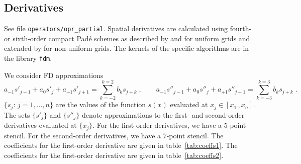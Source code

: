 \subsection{Derivatives}\label{sec:fdm}

See file {\tt operators/opr\_partial}. Spatial derivatives are calculated using fourth- or sixth-order compact Pad\'{e} schemes as described by \cite{Lele:1992} and \cite{Lamballais:2011} for uniform grids and extended by \cite{Shukla:2005} for non-uniform grids. The kernels of the specific algorithms are in the library {\tt fdm}.

We consider FD approximations
\begin{equation}
  a_{-1}s'_{j-1}+a_{0}s'_{j}+a_{+1}s'_{j+1}=\sum_{k=-2}^{k=2}b_ks_{j+k} \;,\qquad
  a_{-1}s''_{j-1}+a_{0}s''_{j}+a_{+1}s''_{j+1}=\sum_{k=-3}^{k=3}b_ks_{j+k} \;.
  \label{equ:coefs}
\end{equation}
$\{s_j:\, j=1,\ldots,n\}$ are the values of the function $s(x)$ evaluated at $x_j\in[x_1\,,x_n]$. The sets $\{s'_j\}$ and $\{s''_j\}$ denote approximations to the first- and second-order derivatives evaluated at $\{x_j\}$. For the first-order derivatives, we have a 5-point stencil. For the second-order derivatives, we have a 7-point stencil. The coefficients for the first-order derivative are given in table~\ref{tab:coeffs1}. The coefficients for the first-order derivative are given in table~\ref{tab:coeffs2}.


